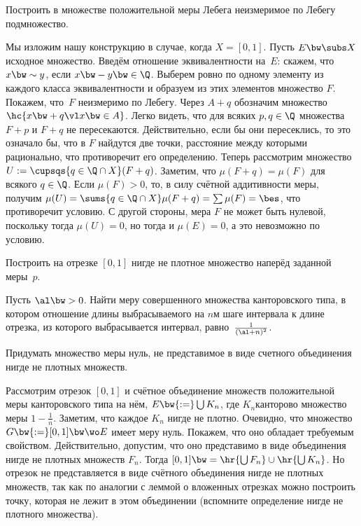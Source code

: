 \documentclass[a4paper]{article}
\begin{document}
\begin{problem}\label{unmes.set.in.set.with.positive.measure}
  Построить в множестве положительной меры Лебега неизмеримое по Лебегу подмножество.
\end{problem}
\begin{solution}
  Мы изложим нашу конструкцию в случае, когда $X = [0,1]$.
  Пусть $E \bw\subs X$\т исходное множество. Введём отношение эквивалентности на~$E$:
  скажем, что $x \bw\sim y$, если $x \bw- y \bw\in \Q$. Выберем ровно по одному элементу из
  каждого класса эквивалентности и образуем из этих элементов множество $F$. Покажем, что~$F$
  неизмеримо по Лебегу. Через $A + q$ обозначим множество $\hc{x \bw+ q \vl x \bw\in A}$.
  Легко видеть, что для всяких $p,q \in \Q$ множества $F + p$ и $F + q$ не пересекаются.
  Действительно, если бы они пересеклись, то это означало бы, что в $F$ найдутся две точки,
  расстояние между которыми рационально, что противоречит его определению. Теперь рассмотрим
  множество $U := \cupsqs{q \in \Q \cap X}(F+q)$. Заметим, что $\mu(F + q) = \mu(F)$ для
  всякого $q\in \Q$. Если $\mu(F) > 0$, то, в силу счётной аддитивности меры, получим
  $\mu(U) = \sums{q \in \Q\cap X} \mu (F+q) = \sum \mu(F) = \bes$, что противоречит условию.
  С другой стороны, мера $F$ не может быть нулевой, поскольку тогда $\mu(U) = 0$, но тогда
  и $\mu(E) = 0$, а это невозможно по условию.
\end{solution}

\begin{problem}
  Построить на отрезке $[0,1]$ нигде не плотное множество наперёд заданной меры~$p$.
\end{problem}

\begin{problem}
  Пусть $\al \bw> 0$. Найти меру совершенного множества канторовского типа, в котором отношение
  длины выбрасываемого на $n$\д м шаге интервала к длине отрезка, из которого выбрасывается интервал,
  равно~$\frac{1}{(\al + n)^2}$.
\end{problem}

\begin{problem}
  Придумать множество меры нуль, не представимое в виде счетного объединения нигде не
  плотных множеств.
\end{problem}
\begin{solution}
  Рассмотрим отрезок $[0,1]$ и счётное объединение множеств положительной меры канторовского
  типа на нём,  $E\bw{:=}\bigcup K_n$, где $K_n$\т канторово множество меры $1-\frac{1}{n}$.
  Заметим, что каждое $K_n$ нигде не плотно. Очевидно, что множество $G \bw{:=} [0,1] \bw\wo E$
  имеет меру нуль. Покажем, что оно обладает требуемым свойством. Действительно, допустим, что
  оно представимо в виде объединения нигде не плотных множеств $F_n$. Тогда
  $[0,1]\bw=\hr{\bigcup F_n} \cup \hr{\bigcup K_n}$. Но отрезок не представляется в виде
  счётного объединения нигде не плотных множеств, так как по аналогии с леммой о вложенных
  отрезках можно построить точку, которая не лежит в этом объединении (вспомните
  определение нигде не плотного множества).
\end{solution}
\end{document}
